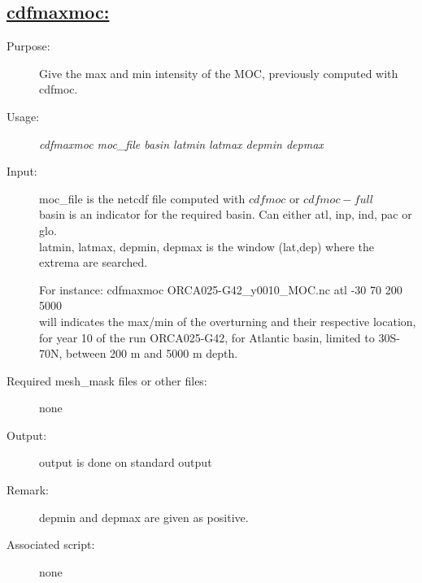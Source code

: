 \documentclass[a4paper,11pt]{article}
\begin{document}
\newpage
\subsection*{\underline{cdfmaxmoc:}}
\begin{description}
\item[Purpose:] Give the max and min intensity of the MOC, previously computed with cdfmoc.
\item[Usage:] {\em cdfmaxmoc moc\_file  basin latmin latmax depmin depmax }
\item[Input:] moc\_file is the netcdf file computed with $cdfmoc$ or $cdfmoc-full$ \\
    basin is an indicator for the required basin. Can either atl, inp, ind, pac or glo. \\
    latmin, latmax, depmin, depmax is the window (lat,dep) where the extrema are searched. 

For instance: cdfmaxmoc ORCA025-G42\_y0010\_MOC.nc atl   -30 70 200 5000 \\
will indicates the max/min of the overturning and their respective location, for year 10 of
the run ORCA025-G42, for Atlantic basin, limited to 30S-70N, between 200 m and 5000 m depth.
\item[Required mesh\_mask files or other files:] none
\item[Output:] output is done on standard output
\item[Remark:] depmin and depmax are given as positive.
\item[Associated script:] none
\end{description}

\newpage
\end{document}
